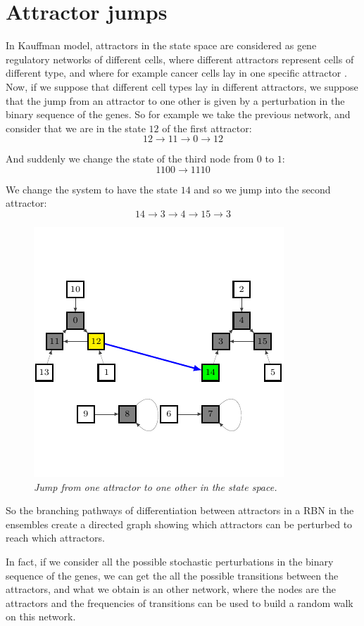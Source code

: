 \section{Attractor jumps}
In Kauffman model, attractors in the state space are considered as gene regulatory networks of different cells, where different attractors represent cells of different type, and where for example cancer cells lay in one specific attractor \cite{K3}\cite{K2}.
Now, if we suppose that different cell types lay in different attractors, we  suppose that the jump from an attractor to one other is given by a perturbation in the binary sequence of the genes.
So for example we take the previous network, and consider that we are in the state $12$ of the first attractor:
$$
12 \to 11 \to 0 \to 12
$$

And suddenly we change the state of the third node from $0$ to $1$:
$$
1100 \to 1110
$$

We change the system to have the state $14$ and so we jump into the second attractor:
$$
14 \to 3 \to 4 \to 15 \to 3
$$
\begin{figure}[h]
\centering
\includegraphics[scale=1.4]{fg4.pdf}
\caption{\emph{Jump from one attractor to one other in the state space.}}
\label{fig:rb4}
\end{figure}

So the branching pathways of differentiation between
attractors in a RBN in the ensembles create a directed
graph showing which attractors can be perturbed to reach which attractors.

In fact, if we consider all the possible stochastic perturbations in the binary sequence of the genes, we can get the all the possible transitions between the attractors, and what we obtain is an other network, where the nodes are the attractors and the frequencies of transitions can be used to build a random walk on this network\cite{K2}\cite{K3}.


